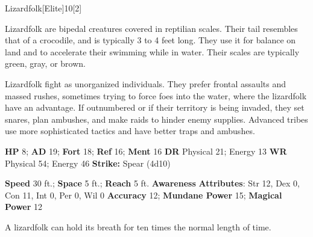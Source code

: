   \begin{monsection}{Lizardfolk}[Elite]{10}[2]
    \vspace{-1em}\vspace{-1em}
    \vspace{0em}

    
    Lizardfolk are bipedal creatures covered in reptilian scales.
    Their tail resembles that of a crocodile, and is typically 3 to 4 feet long.
    They use it for balance on land and to accelerate their swimming while in water.
    Their scales are typically green, gray, or brown.

    Lizardfolk fight as unorganized individuals.
    They prefer frontal assaults and massed rushes, sometimes trying to force foes into the water, where the lizardfolk have an advantage.
    If outnumbered or if their territory is being invaded, they set snares, plan ambushes, and make raids to hinder enemy supplies.
    Advanced tribes use more sophisticated tactics and have better traps and ambushes.
  

    \begin{spellcontent}
      \begin{spelltargetinginfo}
        \pari \textbf{HP} 8;
          \textbf{AD} 19;
          \textbf{Fort} 18;
          \textbf{Ref} 16;
          \textbf{Ment} 16
        \pari \textbf{DR} Physical 21; Energy 13
        \pari \textbf{WR} Physical 54; Energy 46
        \pari \textbf{Strike:}
            Spear  (4d10)
      \end{spelltargetinginfo}
    \end{spellcontent}
    \begin{monsterfooter}
      \pari \textbf{Speed} 30 ft.;
        \textbf{Space} 5 ft.;
        \textbf{Reach} 5 ft.
      \pari \textbf{Awareness} 
      \pari \textbf{Attributes}:
        Str 12, Dex 0,
        Con 11, Int 0,
        Per 0, Wil 0
      \pari \textbf{Accuracy} 12;
        \textbf{Mundane Power} 15;
      \textbf{Magical Power} 12
    \end{monsterfooter}
  \end{monsection}
   A lizardfolk can hold its breath for ten times the normal length of time.
  

